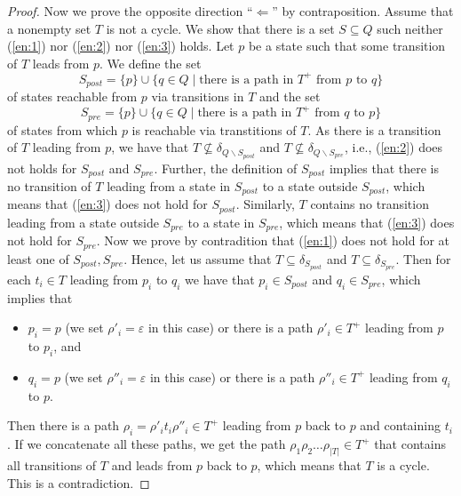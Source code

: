 \documentclass[a4paper,UKenglish,cleveref,autoref,thm-restate]{lipics-v2021}
\newcommand{\pre}{{S_\mathit{pre}}}
\newcommand{\post}{{S_\mathit{post}}}
\begin{document}
\begin{proof}
  Now we prove the opposite direction ``$\Longleftarrow$'' by
  contraposition. Assume that a nonempty set $T$ is not a cycle. We
  show that there is a set $S\subseteq Q$ such neither (\ref{en:1})
  nor (\ref{en:2}) nor (\ref{en:3}) holds. Let $p$ be a state such
  that some transition of $T$ leads from $p$. We define the set
  \[
    \post=\{p\}\cup\{q\in Q\mid \textrm{there is a path in }T^+\textrm{ from }p\textrm{ to }q\}
  \]
  of states reachable from $p$ via transitions in $T$ and the set
  \[
    \pre=\{p\}\cup\{q\in Q\mid \textrm{there is a path in }T^+\textrm{ from }q\textrm{ to }p\}
  \]  
  of states from which $p$ is reachable via transtitions of $T$. As
  there is a transition of $T$ leading from $p$, we have that
  $T\not\subseteq\delta_{Q\smallsetminus\post}$ and
  $T\not\subseteq\delta_{Q\smallsetminus\pre}$, i.e., (\ref{en:2})
  does not holds for $\post$ and $\pre$. Further, the definition of
  $\post$ implies that there is no transition of $T$ leading from a
  state in $\post$ to a state outside $\post$, which means that
  (\ref{en:3}) does not hold for $\post$. Similarly, $T$ contains no
  transition leading from a state outside $\pre$ to a state in $\pre$,
  which means that (\ref{en:3}) does not hold for $\pre$. Now we prove
  by contradition that (\ref{en:1}) does not hold for at least one of
  $\post,\pre$. Hence, let us assume that $T\subseteq\delta_\post$ and
  $T\subseteq\delta_\pre$. Then for each $t_i\in T$ leading from $p_i$
  to $q_i$ we have that $p_i\in\post$ and $q_i\in\pre$, which implies
  that
  \begin{itemize}
  \item $p_i=p$ (we set $\rho'_i=\varepsilon$ in this case) or
    there is a path $\rho'_i\in T^+$ leading from $p$ to $p_i$, and
  \item $q_i=p$ (we set $\rho''_i=\varepsilon$ in this case) or
    there is a path $\rho''_i\in T^+$ leading from $q_i$ to $p$.
  \end{itemize}
  Then there is a path $\rho_i=\rho'_it_i\rho''_i\in T^+$ leading from
  $p$ back to $p$ and containing $t_i$. If we concatenate all these
  paths, we get the path $\rho_1\rho_2\ldots\rho_{|T|}\in T^+$ that
  contains all transitions of $T$ and leads from $p$ back to $p$,
  which means that $T$ is a cycle.  This is a contradiction.
\end{proof}
\end{document}
